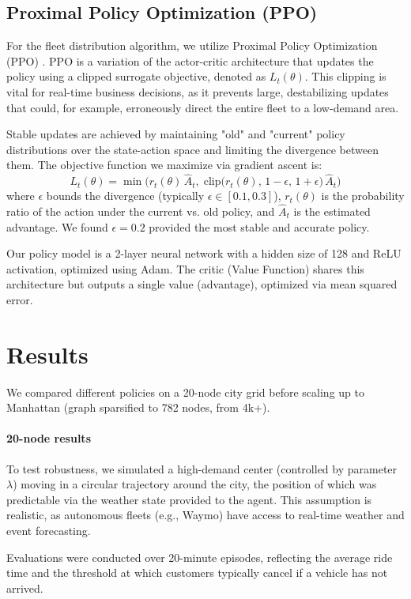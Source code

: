 \documentclass[11pt]{article}
\begin{document}
\subsection{Proximal Policy Optimization (PPO)}
For the fleet distribution algorithm, we utilize Proximal Policy Optimization (PPO)
\parencite{schulman2017proximal}. PPO is a variation of the actor-critic architecture that updates the policy
using a clipped surrogate objective, denoted as $L_t(\theta)$. This clipping is vital for real-time business
decisions, as it prevents large, destabilizing updates that could, for example, erroneously direct the entire
fleet to a low-demand area.

Stable updates are achieved by maintaining "old" and "current" policy distributions over the state-action
space and limiting the divergence between them. The objective function we maximize via gradient ascent is:
\[
		L_t(\theta) = \min \Big( r_t(\theta)\,\hat{A}_t,\; \text{clip}\big(r_t(\theta),\, 1 - \epsilon,\, 1 +
		\epsilon\big)\,\hat{A}_t \Big)
\]
where $\epsilon$ bounds the divergence (typically $\epsilon \in [0.1, 0.3]$), $r_t(\theta)$ is the
probability ratio of the action under the current vs. old policy, and $\hat{A}_t$ is the estimated advantage.
We found $\epsilon=0.2$ provided the most stable and accurate policy.

Our policy model is a 2-layer neural network with a hidden size of 128 and ReLU activation, optimized using
Adam. The critic (Value Function) shares this architecture but outputs a single value (advantage), optimized
via mean squared error.

\section{Results}

We compared different policies on a 20-node city grid before scaling up to Manhattan (graph sparsified to 782
nodes, from 4k+).
\paragraph{20-node results}
To test robustness, we simulated a high-demand center (controlled by parameter $\lambda$) moving in a
circular trajectory around the city, the position of which was predictable via the weather state provided to
the agent. This assumption is realistic, as autonomous fleets (e.g., Waymo) have access to real-time weather
and event forecasting.

Evaluations were conducted over 20-minute episodes, reflecting the average ride time and the threshold at
which customers typically cancel if a vehicle has not arrived.
\end{document}
